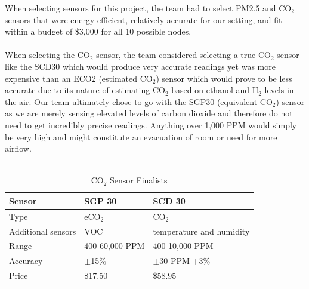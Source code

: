 When selecting sensors for this project, the team had to select PM2.5 and CO$_2$ sensors that were energy efficient, relatively accurate for our setting, and fit within a budget of \$3,000 for all 10 possible nodes. \\
\\
When selecting the CO$_2$ sensor, the team considered selecting a true CO$_2$ sensor like the SCD30 which would produce very accurate readings yet was more expensive than an ECO2 (estimated CO$_2$) sensor which would prove to be less accurate due to its nature of estimating CO$_2$ based on ethanol and H$_2$ levels in the air. Our team ultimately chose to go with the SGP30 (equivalent CO$_2$) sensor as we are merely sensing elevated levels of carbon dioxide and therefore do not need to get incredibly precise readings. Anything over 1,000 PPM would simply be very high and might constitute an evacuation of room or need for more airflow. \\
\\
\begin{table}[h]
\centering
\begin{tabular}{|l|l|l|}
\hline
Sensor             & SGP 30      & SCD 30                   \\ \hline
Type               & eCO$_2$      & CO$_2$                     \\ \hline
Additional sensors & VOC         & temperature and humidity \\ \hline
Range              & 400-60,000 PPM & 400-10,000 PPM              \\ \hline
Accuracy           & $\pm$15\%      & $\pm$30 PPM +3\%              \\ \hline
Price              & \$17.50      & \$58.95                   \\ \hline
\end{tabular}
\caption{CO$_2$ Sensor Finalists}
\label{tab:CO_2 Sensor Finalists}
\end{table}
\\
